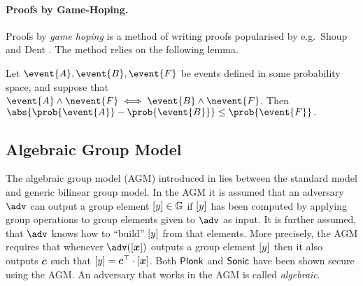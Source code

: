 \documentclass[runningheads,10pt]{llncs}
\let\spvec\vec
\let\vec\accentvec
\let\spvec\vec
\let\vec\spvec
\def\vec#1{\mathchoice{\mbox{\boldmath$\displaystyle#1$}}
  {\mbox{\boldmath$\textstyle#1$}} {\mbox{\boldmath$\scriptstyle#1$}}
  {\mbox{\boldmath$\scriptscriptstyle#1$}}}
\begin{document}

\paragraph{Proofs by Game-Hoping.}
Proofs by \emph{game hoping} is a method of writing proofs popularised by
e.g.~Shoup \cite{EPRINT:Shoup04} and Dent \cite{EPRINT:Dent06c}. The method
relies on the following lemma.

\begin{lemma}
	\label{lem:difference_lemma}
	Let $\event{A}, \event{B}, \event{F}$ be events defined in some probability
	space, and suppose that $\event{A} \land \nevent{F} \iff \event{B}
		\land \nevent{F}$.  Then 
	$
		\abs{\prob{\event{A}} - \prob{\event{B}}} \leq \prob{\event{F}}\,.
	$
\end{lemma}
\subsection{Algebraic Group Model}
The algebraic group model (AGM) introduced in \cite{C:FucKilLos18} lies between
the standard model and generic bilinear group model. In the AGM it is assumed
that an adversary $\adv$ can output a group element $\left[y\right] \in \mathbb{G}$ if
$\left[y\right]$ has been computed by applying group operations to group elements
given to $\adv$ as input. It is further assumed, that $\adv$ knows how to
``build'' $\left[y\right]$ from that elements. More precisely, the AGM requires that
whenever $\adv(\gnone{\vec{x}})$ outputs a group element $\left[y\right]$ then it
also outputs $\vec{c}$ such that $\gnone{y} = \vec{c}^\top \cdot
\gnone{\vec{x}}$. Both $\textnormal{\textsf{Plonk}}$ and ${\textnormal{\textsf{Sonic}}}$ have been shown secure using the
AGM. An adversary that works in the AGM is called \emph{algebraic}.
\end{document}
